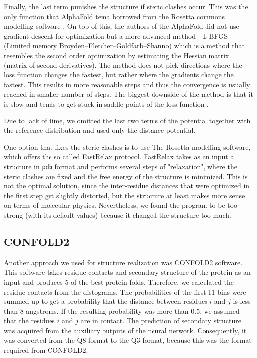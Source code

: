 Finally, the last term punishes the structure if steric clashes occur. This was the only function that AlphaFold tema borrowed from the Rosetta commons modelling software \cite{rosettacommons}. On top of this, the authors of the AlphaFold did not use gradient descent for optimization but a more advanced method - L-BFGS (Limited memory Broyden–Fletcher–Goldfarb–Shanno) which is a method that resembles the second order optimization by estimating the Hessian matrix (matrix of second derivatives). The method does not pick directions where the loss function changes the fastest, but rather where the gradients change the fastest. This results in more reasonable steps and thus the convergence is usually reached in smaller number of steps. The biggest downside of the method is that it is slow and tends to get stuck in saddle points of the loss function \cite{nn_dl}.

Due to lack of time, we omitted the last two terms of the potential together with the reference distribution and used only the distance potential. 

One option that fixes the steric clashes is to use The Rosetta modelling software, which offers the so called FastRelax protocol. 
FastRelax takes as an input a structure in \texttt{pdb} format and performs several steps of "relaxation", where the steric clashes are fixed and the free energy of the structure is minimized. 
This is not the optimal solution, since the inter-residue distances that were optimized in the first step get slightly distorted, but the structure at least makes more sense on terms of molecular physics. 
Nevertheless, we found the program to be too strong (with its default values) because it changed the structure too much. 

\subsection{CONFOLD2}
Another approach we used for structure realization was CONFOLD2 software.
This software takes residue contacts and secondary structure of the protein as an input and produces 5 of the best protein folds.
Therefore, we calculated the residue contacts from the distograms.
The probabilities of the first 11 bins were summed up to get a probability that the distance between residues $i$ and $j$ is less than 8 angstroms.
If the resulting probability was more than 0.5, we assumed that the residues $i$ and $j$ are in contact.
The prediction of secondary structure was acquired from the auxiliary outputs of the neural network.
Consequently, it was converted from the Q8 format to the Q3 format, because this was the format required from CONFOLD2.

